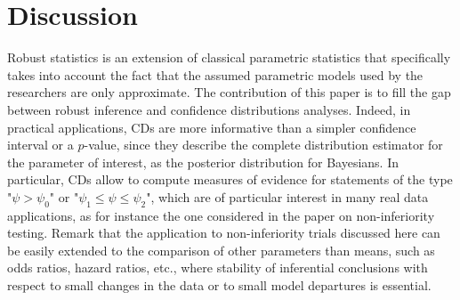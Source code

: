 \documentclass[preprint,12pt,authoryear]{elsarticle}
\begin{document}
 



\section{Discussion}

Robust statistics is an extension of classical parametric statistics that specifically takes into account the fact that the assumed parametric models used by the researchers are only approximate. The contribution of this paper is to fill the gap between robust inference and confidence distributions analyses. Indeed, in practical applications, CDs are more informative than a simpler confidence interval or a $p$-value, since they describe the complete  distribution estimator for the parameter of interest, as the posterior distribution for Bayesians. In particular, CDs allow to compute measures of evidence for statements of the type "$\psi > \psi_0$" or "$\psi_1 \leq \psi \leq \psi_2$", which are of particular interest in many real data applications, as for instance the one considered in the paper on non-inferiority testing. Remark that the application to non-inferiority trials discussed here can be easily extended to the comparison of other parameters than means, such as odds ratios, hazard ratios, etc., where stability of inferential conclusions with respect to small changes in the data or to small model departures is essential.
\end{document}
